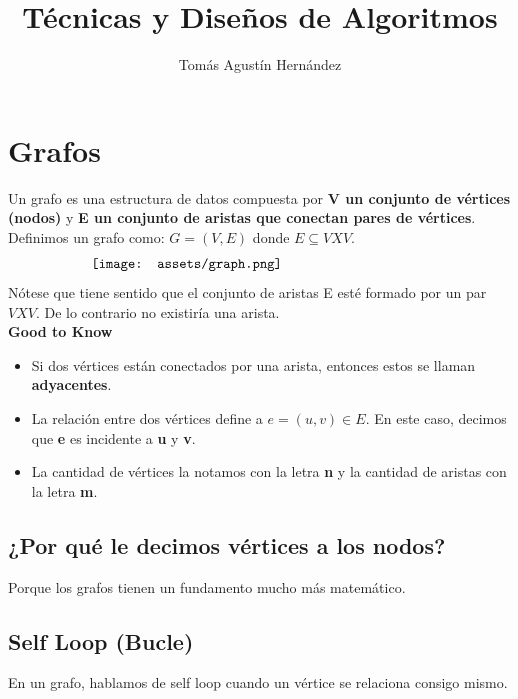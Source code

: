 \documentclass[10pt,a4paper]{article}
\title{Técnicas y Diseños de Algoritmos}
\author{Tomás Agustín Hernández}
\date{}
\begin{document}
\maketitle

\begin{figure}[b]
    \centering
\end{figure}
\newpage
\section*{Grafos}
Un grafo es una estructura de datos compuesta por \textbf{V un conjunto de vértices (nodos)} y \textbf{E un conjunto de aristas que conectan pares de vértices}. \\
Definimos un grafo como: $G = (V, E)$ donde $E \subseteq V X V$.
\[\begin{minipage}[b]{0.7\textwidth}
    \texttt{[image: assets/graph.png]}
\end{minipage}\]
Nótese que tiene sentido que el conjunto de aristas E esté formado por un par $V X V$. De lo contrario no existiría una arista. \\
\textbf{Good to Know} 
\begin{itemize}
    \item Si dos vértices están conectados por una arista, entonces estos se llaman \textbf{adyacentes}.
    \item La relación entre dos vértices define a $e = (u,v) \in E$. En este caso, decimos que \textbf{e} es incidente a \textbf{u} y \textbf{v}.
    \item La cantidad de vértices la notamos con la letra \textbf{n} y la cantidad de aristas con la letra \textbf{m}.
\end{itemize}
\subsection*{¿Por qué le decimos vértices a los nodos?}
Porque los grafos tienen un fundamento mucho más matemático.
\subsection*{Self Loop (Bucle)}
En un grafo, hablamos de self loop cuando un vértice se relaciona consigo mismo.
\end{document}
